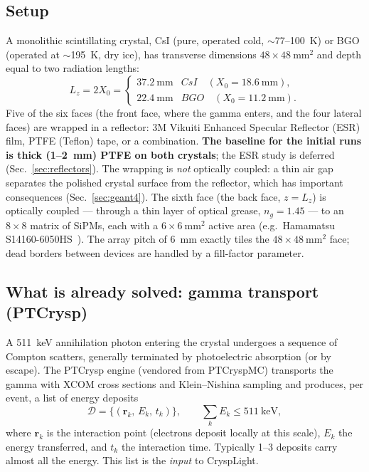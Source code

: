 \documentclass[11pt,a4paper]{article}
\newcommand{\csi}{CsI}
\newcommand{\bgo}{BGO}
\newcommand{\xzero}{X_0}
\begin{document}
\subsection{Setup}

A monolithic scintillating crystal, \csi{} (pure, operated cold, $\sim$77--100~K) or \bgo{}
(operated at $\sim$195~K, dry ice), has transverse dimensions $48\times48~\mathrm{mm}^2$ and
depth equal to two radiation lengths:
\begin{equation}
  L_z = 2\xzero =
  \begin{cases}
    37.2~\mathrm{mm} & \csi{} \quad (\xzero = 18.6~\mathrm{mm}),\\
    22.4~\mathrm{mm} & \bgo{} \quad (\xzero = 11.2~\mathrm{mm}).
  \end{cases}
\end{equation}
Five of the six faces (the front face, where the gamma enters, and the four lateral faces) are
wrapped in a reflector: 3M Vikuiti Enhanced Specular Reflector (ESR) film, PTFE (Teflon) tape,
or a combination. \textbf{The baseline for the initial runs is thick (1--2~mm) PTFE on both
crystals}; the ESR study is deferred (Sec.~\ref{sec:reflectors}). The wrapping is \emph{not}
optically coupled: a thin air gap separates the
polished crystal surface from the reflector, which has important consequences
(Sec.~\ref{sec:geant4}). The sixth face (the back face, $z = L_z$) is optically coupled ---
through a thin layer of optical grease, $n_g = 1.45$ --- to an $8\times8$
matrix of SiPMs, each with a $6\times6~\mathrm{mm}^2$ active area (e.g.\ Hamamatsu
S14160-6050HS~\cite{hamamatsu}). The array pitch of 6~mm exactly tiles the
$48\times48~\mathrm{mm}^2$ face; dead borders between devices are handled by a fill-factor
parameter.

\subsection{What is already solved: gamma transport (PTCrysp)}

A 511~keV annihilation photon entering the crystal undergoes a sequence of Compton scatters,
generally terminated by photoelectric absorption (or by escape). The PTCrysp engine
(vendored from PTCryspMC) transports the gamma with XCOM cross sections and Klein--Nishina
sampling and produces, per event, a list of energy deposits
\begin{equation}
  \mathcal{D} = \{ (\mathbf{r}_k,\, E_k,\, t_k) \},
  \qquad \sum_k E_k \le 511~\mathrm{keV},
\end{equation}
where $\mathbf{r}_k$ is the interaction point (electrons deposit locally at this scale),
$E_k$ the energy transferred, and $t_k$ the interaction time. Typically 1--3 deposits carry
almost all the energy. This list is the \emph{input} to CryspLight.
\end{document}
